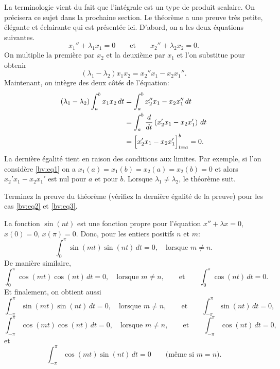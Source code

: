 La terminologie vient du fait que l'intégrale est un type de produit scalaire. On précisera ce sujet dans la prochaine section. Le théorème a une preuve  très petite, élégante et éclairante qui est présentée ici.  
D'abord, on a les deux équations suivantes. 
\begin{equation*}
x_1'' + \lambda_1 x_1 = 0
\qquad \text{et} \qquad
x_2'' + \lambda_2 x_2 = 0.
\end{equation*}
On multiplie la première par $x_2$ et la deuxième par $x_1$ et l'on substitue pour obtenir 
\begin{equation*}
(\lambda_1 - \lambda_2) x_1 x_2 = x_2'' x_1 - x_2 x_1'' .
\end{equation*}
Maintenant, on intègre des deux côtés de l'équation: 
\begin{equation*}
\begin{split}
(\lambda_1 - \lambda_2) \int_a^b x_1 x_2 \,dt
& =
\int_a^b x_2'' x_1 - x_2 x_1'' \,dt \\
& =
\int_a^b \frac{d}{dt} \left( x_2' x_1 - x_2 x_1' \right) \,dt \\
& =
\Bigl[ x_2' x_1 - x_2 x_1' \Bigr]_{t=a}^b
= 0 .
\end{split}
\end{equation*}
La dernière égalité tient en raison des conditions aux limites. Par exemple, si l'on considère 
 \eqref{bv:eq1} on a  $x_1(a) = x_1(b) = x_2(a) = x_2(b) = 0$
et alors $x_2' x_1 - x_2 x_1'$ est nul pour $a$ et pour $b$.
Lorsque $\lambda_1 \not= \lambda_2$, le théorème suit.

\begin{exercise}[facile]
Terminez la preuve du théorème (vérifiez la dernière égalité de la preuve) pour les cas 
\eqref{bv:eq2} et \eqref{bv:eq3}.
\end{exercise}

La fonction $\sin (n t)$ est une fonction propre pour l'équation 
$x''+\lambda x = 0$, $x(0) = 0$, $x(\pi) = 0$. 
Donc, pour les entiers positifs $n$ et $m$:  
\begin{equation*}
\int_{0}^\pi \sin (mt) \sin (nt) \,dt = 0 ,
\quad
\text{lorsque } m \not = n.
\end{equation*}
De manière similaire,
\begin{equation*}
\int_{0}^\pi \cos (mt) \cos (nt) \,dt = 0 ,
\quad
\text{lorsque } m \not = n,
\qquad \text{et} \qquad
\int_{0}^\pi  \cos (nt) \,dt = 0 .
\end{equation*}
Et finalement, on obtient aussi
\begin{equation*}
\int_{-\pi}^\pi \sin (mt) \sin (nt) \,dt = 0 ,
\quad
\text{lorsque } m \not = n, 
\qquad \text{et} \qquad
\int_{-\pi}^\pi  \sin (nt) \,dt = 0 ,
\end{equation*}
\begin{equation*}
\int_{-\pi}^\pi \cos (mt) \cos (nt) \,dt = 0 ,
\quad
\text{lorsque } m \not = n,
\qquad \text{et} \qquad
\int_{-\pi}^\pi  \cos (nt) \,dt = 0 ,
\end{equation*}
et
\begin{equation*}
\int_{-\pi}^\pi \cos (mt) \sin (nt) \,dt = 0 
\qquad \text{(même si $m=n$).}
\end{equation*}

